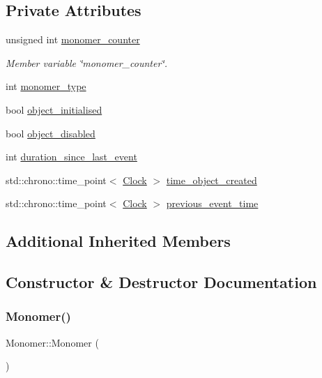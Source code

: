 \subsection*{Private Attributes}
\begin{DoxyCompactItemize}
\item 
unsigned int \mbox{\hyperlink{classMonomer_a163885a7c7da282e9487425392a8f570}{monomer\+\_\+counter}}
\begin{DoxyCompactList}\small\item\em Member variable \char`\"{}monomer\+\_\+counter\char`\"{}. \end{DoxyCompactList}\item 
int \mbox{\hyperlink{classMonomer_acc09d7e702f91a7b14ff58863eb5e4a6}{monomer\+\_\+type}}
\item 
bool \mbox{\hyperlink{classMonomer_ac79d26bc31d0bff553773e38f5f7b9e5}{object\+\_\+initialised}}
\item 
bool \mbox{\hyperlink{classMonomer_ad80cf80e7bc9b29d63e9bb15a364abed}{object\+\_\+disabled}}
\item 
int \mbox{\hyperlink{classMonomer_aaba064b94b15cdafaa5da341a97b7a7f}{duration\+\_\+since\+\_\+last\+\_\+event}}
\item 
std\+::chrono\+::time\+\_\+point$<$ \mbox{\hyperlink{universe_8h_a0ef8d951d1ca5ab3cfaf7ab4c7a6fd80}{Clock}} $>$ \mbox{\hyperlink{classMonomer_a689f4abe0f31c0a7d32221242b3bf944}{time\+\_\+object\+\_\+created}}
\item 
std\+::chrono\+::time\+\_\+point$<$ \mbox{\hyperlink{universe_8h_a0ef8d951d1ca5ab3cfaf7ab4c7a6fd80}{Clock}} $>$ \mbox{\hyperlink{classMonomer_ac2b6be09ea5da5953ced21c9d7d5e3d1}{previous\+\_\+event\+\_\+time}}
\end{DoxyCompactItemize}
\subsection*{Additional Inherited Members}


\subsection{Constructor \& Destructor Documentation}
\mbox{\label{classMonomer_a2b1f69caca47d8597e43300ae7076095}} 
\subsubsection{\texorpdfstring{Monomer()}{Monomer()}\hspace{0.1cm}{\footnotesize\ttfamily [1/4]}}
{\footnotesize\ttfamily Monomer\+::\+Monomer (\begin{DoxyParamCaption}{ }\end{DoxyParamCaption})\hspace{0.3cm}{\ttfamily [inline]}}

